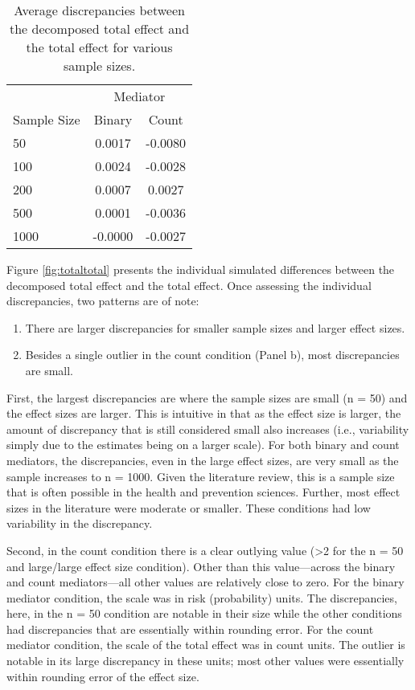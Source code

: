 \documentclass[]{DissertateUSU}
\providecommand{\tightlist}{%
  \setlength{\itemsep}{0pt}\setlength{\parskip}{0pt}}
\begin{document}
\begin{table}[ht]
\centering
\caption{Average discrepancies between the decomposed total effect and the total effect for various sample sizes.}
\begin{tabular}{lcc}
\toprule
  & \multicolumn{2}{c}{Mediator} \\
Sample Size & Binary & Count \\ 
\midrule
  50   & 0.0017  & -0.0080 \\ 
  100  & 0.0024  & -0.0028 \\ 
  200  & 0.0007  &  0.0027 \\ 
  500  & 0.0001  & -0.0036 \\ 
  1000 & -0.0000 & -0.0027 \\ 
\bottomrule
\end{tabular}\label{tab_discrep}
\end{table}

Figure \ref{fig:totaltotal} presents the individual simulated
differences between the decomposed total effect and the total effect.
Once assessing the individual discrepancies, two patterns are of note:

\begin{enumerate}
\def\labelenumi{\arabic{enumi}.}
\tightlist
\item
  There are larger discrepancies for smaller sample sizes and larger
  effect sizes.
\item
  Besides a single outlier in the count condition (Panel b), most
  discrepancies are small.
\end{enumerate}

First, the largest discrepancies are where the sample sizes are small (n
= 50) and the effect sizes are larger. This is intuitive in that as the
effect size is larger, the amount of discrepancy that is still
considered small also increases (i.e., variability simply due to the
estimates being on a larger scale). For both binary and count mediators,
the discrepancies, even in the large effect sizes, are very small as the
sample increases to n = 1000. Given the literature review, this is a
sample size that is often possible in the health and prevention
sciences. Further, most effect sizes in the literature were moderate or
smaller. These conditions had low variability in the discrepancy.

Second, in the count condition there is a clear outlying value
(\textgreater{}2 for the n = 50 and large/large effect size condition).
Other than this value---across the binary and count mediators---all
other values are relatively close to zero. For the binary mediator
condition, the scale was in risk (probability) units. The discrepancies,
here, in the n = 50 condition are notable in their size while the other
conditions had discrepancies that are essentially within rounding error.
For the count mediator condition, the scale of the total effect was in
count units. The outlier is notable in its large discrepancy in these
units; most other values were essentially within rounding error of the
effect size.
\end{document}
